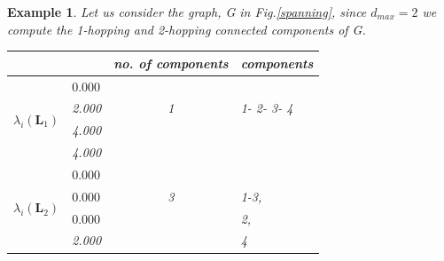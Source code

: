\documentclass[10pt,a4paper]{article}
\newtheorem{exa}{Example}
\begin{document}
    	    \begin{exa}
    	    	Let us consider the graph, G in Fig.\ref{spanning}, since $d_{max} = 2$ we compute the 1-hopping and 2-hopping connected components of G.
    	    	
    	    	\begin{table}[H]
    	    		\centering
    	    		\begin{tabular}{ |l|l|c|l| }
    	    			\hline
    	    			& & no. of components & components \\
    	    			\hline
    	    			\multirow{4}{*}{$\lambda_i(\mathbf{L}_1)$} & $\mathbf{0.000}$& & \\
    	    			& 2.000& 1& 1- 2- 3- 4\\
    	    			& 4.000 & & \\
    	    			& 4.000 & & \\ \hline
    	    			\multirow{4}{*}{$\lambda_i(\mathbf{L}_2)$} & $\mathbf{0.000}$& & \\
    	    			& $\mathbf{0.000}$& 3 & 1-3,\\
    	    			& $\mathbf{0.000}$ &  & 2,\\
    	    			& 2.000 &  & 4\\
    	    			\hline
    	    		\end{tabular}   
    	    	\end{table}
    	    	
    	    	
    	    \end{exa}
    	   
\end{document}
